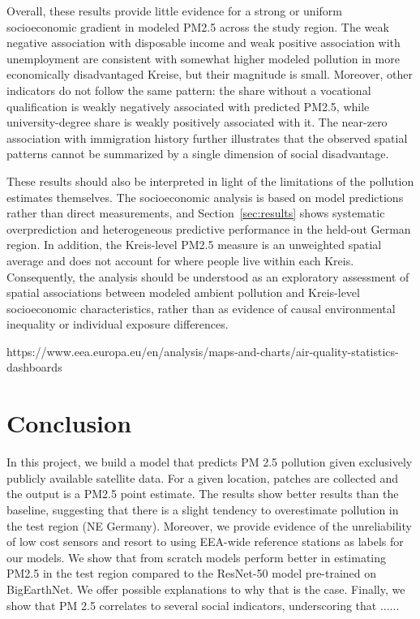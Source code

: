 \documentclass[english, a4paper, numbers=noenddot]{article}
\begin{document}
Overall, these results provide little evidence for a strong or uniform
socioeconomic gradient in modeled PM2.5 across the study region. The weak
negative association with disposable income and weak positive association
with unemployment are consistent with somewhat higher modeled pollution in
more economically disadvantaged Kreise, but their magnitude is small.
Moreover, other indicators do not follow the same pattern: the share without
a vocational qualification is weakly negatively associated with predicted
PM2.5, while university-degree share is weakly positively associated with it.
The near-zero association with immigration history further illustrates that
the observed spatial patterns cannot be summarized by a single dimension of
social disadvantage.

These results should also be interpreted in light of the limitations of the
pollution estimates themselves. The socioeconomic analysis is based on model
predictions rather than direct measurements, and Section~\ref{sec:results}
shows systematic overprediction and heterogeneous predictive performance in
the held-out German region. In addition, the Kreis-level PM2.5 measure is an
unweighted spatial average and does not account for where people live within
each Kreis. Consequently, the analysis should be understood as an exploratory
assessment of spatial associations between modeled ambient pollution and
Kreis-level socioeconomic characteristics, rather than as evidence of causal
environmental inequality or individual exposure differences.

https://www.eea.europa.eu/en/analysis/maps-and-charts/air-quality-statistics-dashboards

\section{Conclusion}

In this project, we build a model that predicts PM 2.5 pollution given exclusively publicly available satellite data. For a given location, patches are collected and the output is a PM2.5 point estimate. The results show better results than the baseline, suggesting that there is a slight tendency to overestimate pollution in the test region (NE Germany). Moreover, we provide evidence of the unreliability of low cost sensors and resort to using EEA-wide reference stations as labels for our models. We show that from scratch models perform better in estimating PM2.5 in the test region compared to the ResNet-50 model pre-trained on BigEarthNet. We offer possible explanations to why that is the case. Finally, we show that PM 2.5 correlates to several social indicators, underscoring that ......
\end{document}
